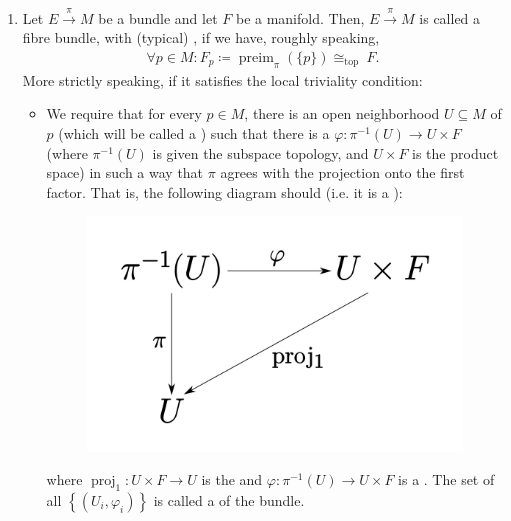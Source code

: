 \documentclass{article}
\begin{document}
\begin{enumerate}
\item {} Let $E \stackrel{\pi}{\rightarrow} M$ be a bundle and let $F$ be a manifold. Then, $E \stackrel{\pi}{\rightarrow} M$ is called a fibre bundle, with (typical) , if we have, roughly speaking,
\begin{align*}
\forall p \in M: F_p\coloneqq \operatorname{preim}_{\pi}(\{p\}) \cong_{\text {top }} F .
\end{align*}
More strictly speaking, if it  satisfies the local triviality condition:
\begin{itemize}
    \item We require that for every $p \in M$, there is an open neighborhood $U \subseteq M$ of $p$ (which will be called a ) such that there is a  $\varphi: \pi^{-1}(U) \rightarrow U \times F$ (where $\pi^{-1}(U)$ is given the subspace topology, and $U \times F$ is the product space) in such a way that $\pi$ agrees with the projection onto the first factor. That is, the following diagram should  (i.e. it is a ):
    \begin{figure}[H]
              \centering
              \includegraphics[scale=0.04]{Figs/5.png}
          \end{figure}
      where $\operatorname{proj}_{1}: U \times F \rightarrow U$ is the  and $\varphi: \pi^{-1}(U) \rightarrow U \times F$ is a . The set of all $\left\{\left(U_{i}, \varphi_{i}\right)\right\}$ is called a  of the bundle.    
      

\end{itemize}
\end{enumerate}
\end{document}
